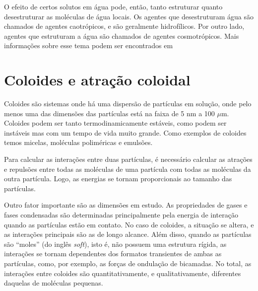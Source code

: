 	O efeito de certos solutos em água pode, então, tanto estruturar quanto desestruturar as moléculas de água locais. Os agentes que desestruturam água são chamados de agentes caotrópicos, e são geralmente hidrofílicos. Por outro lado, agentes que estruturam a água são chamados de agentes cosmotrópicos. Mais informações sobre esse tema podem ser encontrados em \citeauthor{Marcus2009a} %
	   
	
	
	\section{Coloides e atração coloidal} 
	\label{sec:coloides_atracao_coloidal}
	Coloides são sistemas onde há uma dispersão de partículas em solução, onde pelo menos uma das dimensões das partículas está na faixa de 5 nm a 100 \(\mu\)m. Coloides podem ser tanto termodinamicamente estáveis, como podem ser instáveis mas com um tempo de vida muito grande. Como exemplos de coloides temos micelas, moléculas poliméricas e emulsões.\cite{Cosgrove2009, Israelachvili2011}
	
	Para calcular as interações entre duas partículas, é necessário calcular as atrações e repulsões entre todas as moléculas de uma partícula com todas as moléculas da outra partícula. Logo, as energias se tornam proporcionais ao tamanho das partículas. 
	
	Outro fator importante são as dimensões em estudo. As propriedades de gases e fases condensadas são determinadas principalmente pela energia de interação quando as partículas estão em contato. No caso de coloides, a situação se altera, e as interações principais são as de longo alcance. Além disso, quando as partículas são ``moles'' (do inglês \emph{soft}), isto é, não possuem uma estrutura rígida, as interações se tornam dependentes dos formatos transientes de ambas as partículas, como, por exemplo, as forças de ondulação de bicamadas. No total, as interações entre coloides são quantitativamente, e qualitativamente, diferentes daquelas de moléculas pequenas.
	
